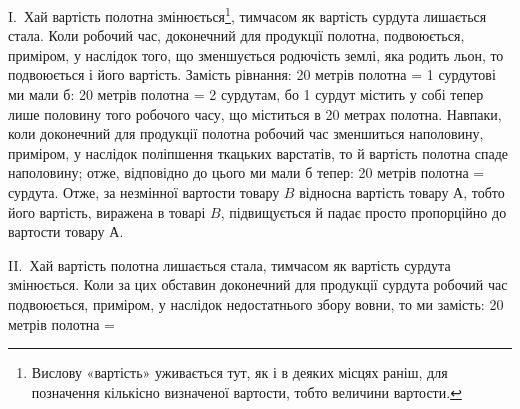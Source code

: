 I.~Хай вартість полотна змінюється\footnote{
Вислову «вартість» уживається тут, як і в деяких місцях раніш,
для позначення кількісно визначеної вартости, тобто величини вартости.
}, тимчасом як вартість
сурдута лишається стала. Коли робочий час, доконечний для продукції
полотна, подвоюється, приміром, у наслідок того, що зменшується
родючість землі, яка родить льон, то подвоюється і його
вартість. Замість рівнання: 20 метрів полотна = 1 сурдутові ми
мали б: 20 метрів полотна = 2 сурдутам, бо 1 сурдут містить у
собі тепер лише половину того робочого часу, що міститься в
20 метрах полотна. Навпаки, коли доконечний для продукції
полотна робочий час зменшиться наполовину, приміром, у наслідок
поліпшення ткацьких варстатів, то й вартість полотна спаде
наполовину; отже, відповідно до цього ми мали б тепер: 20 метрів
полотна =  сурдута. Отже, за незмінної вартости товару $B$
відносна вартість товару $А$, тобто його вартість, виражена в товарі
$B$, підвищується й падає просто пропорційно до вартости
товару $А$.

II.~Хай вартість полотна лишається стала, тимчасом як вартість
сурдута змінюється. Коли за цих обставин доконечний для
продукції сурдута робочий час подвоюється, приміром, у наслідок
недостатнього збору вовни, то ми замість: 20 метрів полотна =
\parbreak{}  %
